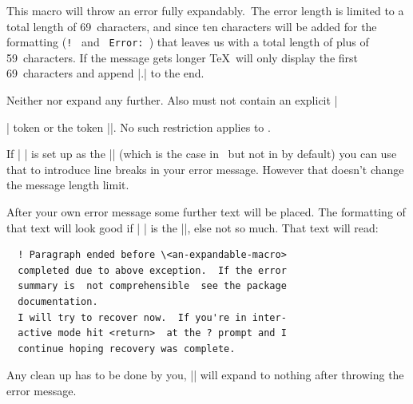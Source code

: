 \begin{function}{\ekverr}
  \begin{syntax}
  \end{syntax}
  This macro will throw an error fully expandably.\footnotemark\ The error
  length is limited to a total length of 69~characters, and since ten characters
  will be added for the formatting (\verb*|! | and \verb*| Error: |) that leaves
  us with a total length of  plus  of 59~characters.
  If the message gets longer \TeX\ will only display the first 69~characters and
  append |\ETC.| to the end.

  Neither  nor  expand any further. Also
   must not contain an explicit |\par| token or the token
  |\thanks@jfbu|. No such restriction applies to .

  If |^^J| is set up as the |\newlinechar| (which is the case in \LaTeXe\ but
  not in  by default) you can use that to introduce line breaks
  in your error message. However that doesn't change the message length limit.
\end{function}
After your own error message some further text will be placed. The formatting
of that text will look good if |^^J| is the |\newlinechar|, else not so much.
That text will read:
\begin{verbatim}
  ! Paragraph ended before \<an-expandable-macro>
  completed due to above exception.  If the error
  summary is  not comprehensible  see the package
  documentation.
  I will try to recover now.  If you're in inter-
  active mode hit <return>  at the ? prompt and I
  continue hoping recovery was complete.
\end{verbatim}
Any clean up has to be done by you, |\ekverr| will expand to nothing after
throwing the error message.

